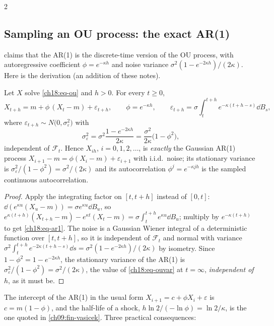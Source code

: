 \begin{paracol}{2}
\subsection{Sampling an OU process: the exact AR(1)}\label{ch18:sec-ar1}
 claims that the AR(1) is the discrete-time version of the OU process, with autoregressive coefficient $\phi=e^{-\kappa h}$ and noise variance $\sigma^2(1-e^{-2\kappa h})/(2\kappa)$. Here is the derivation (an addition of these notes).

\begin{proposition}\label{ch18:prop-ar1}
Let $X$ solve \eqref{ch18:eq-ou} and $h>0$. For every $t\ge0$,
\begin{equation}\label{ch18:eq-ar1}
  X_{t+h}=m+\phi\,(X_t-m)+\varepsilon_{t+h},\qquad\phi=e^{-\kappa h},\qquad\varepsilon_{t+h}=\sigma\int_t^{t+h}e^{-\kappa(t+h-s)}\dd B_s,
\end{equation}
where $\varepsilon_{t+h}\sim N\bigl(0,\sigma_\varepsilon^2\bigr)$ with
\begin{equation}\label{ch18:eq-ar1var}
  \sigma_\varepsilon^2=\sigma^2\frac{1-e^{-2\kappa h}}{2\kappa}=\frac{\sigma^2}{2\kappa}\bigl(1-\phi^2\bigr),
\end{equation}
independent of $\mathcal F_t$. Hence $X_{ih}$, $i=0,1,2,\dots$, is \emph{exactly} the Gaussian AR(1) process $X_{i+1}-m=\phi(X_i-m)+\varepsilon_{i+1}$ with i.i.d.\ noise; its stationary variance is $\sigma_\varepsilon^2/(1-\phi^2)=\sigma^2/(2\kappa)$ and its autocorrelation $\phi^j=e^{-\kappa jh}$ is the sampled continuous autocorrelation.
\end{proposition}
\begin{proof}
Apply the integrating factor on $[t,t+h]$ instead of $[0,t]$: $\dd(e^{\kappa u}(X_u-m))=\sigma e^{\kappa u}\dd B_u$, so $e^{\kappa(t+h)}(X_{t+h}-m)-e^{\kappa t}(X_t-m)=\sigma\int_t^{t+h}e^{\kappa u}\dd B_u$; multiply by $e^{-\kappa(t+h)}$ to get \eqref{ch18:eq-ar1}. The noise is a Gaussian Wiener integral of a deterministic function over $[t,t+h]$, so it is independent of $\mathcal F_t$ and normal with variance $\sigma^2\int_t^{t+h}e^{-2\kappa(t+h-s)}\dd s=\sigma^2(1-e^{-2\kappa h})/(2\kappa)$ by isometry. Since $1-\phi^2=1-e^{-2\kappa h}$, the stationary variance of the AR(1) is $\sigma_\varepsilon^2/(1-\phi^2)=\sigma^2/(2\kappa)$, the value of \eqref{ch18:eq-ouvar} at $t=\infty$, \emph{independent of $h$}, as it must be.
\end{proof}
The intercept of the AR(1) in the usual form $X_{i+1}=c+\phi X_i+\varepsilon$ is $c=m(1-\phi)$, and the half-life of a shock, $h\ln2/(-\ln\phi)=\ln2/\kappa$, is the one quoted in \cref{ch09:fin-vasicek}. Three practical consequences:

\end{paracol}
